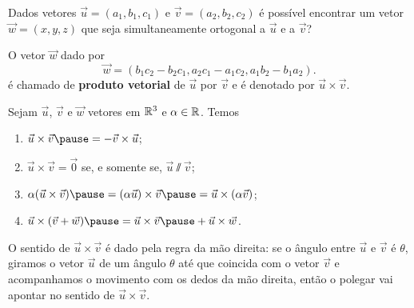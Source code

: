 \documentclass{beamer}
\begin{document}
\begin{frame}
    Dados vetores $\vec{u} = (a_1,b_1,c_1)$ \pause e $\vec{v} = (a_2,b_2,c_2)$ \pause é possível encontrar um vetor $\vec{w} = (x,y,z)$ \pause que seja simultaneamente \pause ortogonal a $\vec{u}$ \pause e a $\vec{v}$?
\end{frame}

\begin{frame}
    O vetor $\vec{w}$ dado por
    \begin{equation}\label{produtovetorial}
        \vec{w} = (b_1c_2 - b_2c_1, a_2c_1 - a_1c_2, a_1b_2 - b_1a_2).
    \end{equation}
    é chamado de \textbf{produto vetorial} de $\vec{u}$ por $\vec{v}$ e é denotado por $\vec{u}\times\vec{v}$.
\end{frame}

\begin{frame}
    \begin{proposicao}
        Sejam $\vec{u}$, \pause $\vec{v}$ \pause e $\vec{w}$ \pause vetores em $\mathbb{R}^3$ \pause e $\alpha \in \mathbb{R}$. \pause Temos\pause
        \begin{enumerate}[label=({\alph*})]
            \item $\vec{u}\times\vec{v} \pause = -\vec{v}\times\vec{u}$;\pause
            \item $\vec{u}\times\vec{v} = \vec{0}$ \pause se, e somente se, \pause $\vec{u}\varparallel\vec{v}$;\pause
            \item $\alpha(\vec{u}\times\vec{v}) \pause = (\alpha\vec{u})\times\vec{v} \pause = \vec{u}\times(\alpha\vec{v})$;\pause
            \item $\vec{u}\times(\vec{v} + \vec{w}) \pause = \vec{u}\times\vec{v} \pause + \vec{u}\times\vec{w}$.
        \end{enumerate}
    \end{proposicao}
\end{frame}

\begin{frame}
    \begin{observacao}
        O sentido de $\vec{u}\times\vec{v}$ \pause é dado pela regra da mão direita: \pause se o ângulo entre $\vec{u}$ e $\vec{v}$ \pause é $\theta$, \pause giramos o vetor $\vec{u}$ de um ângulo $\theta$ \pause até que coincida com o vetor $\vec{v}$ \pause e acompanhamos o movimento com os dedos da mão direita, \pause então o polegar vai apontar no sentido de $\vec{u}\times\vec{v}$.
    \end{observacao}
\end{frame}
\end{document}
